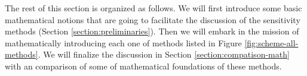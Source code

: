 
The rest of this section is organized as follows. 
We will first introduce some basic mathematical notions that are going to facilitate the discussion of the sensitivity methods (Section \ref{section:preliminaries}).
Then we will embark in the mission of mathematically introducing each one of methods listed in Figure \ref{fig:scheme-all-methods}.
We will finalize the discussion in Section \ref{section:compatison-math} with an comparison of some of mathematical foundations of these methods. 
